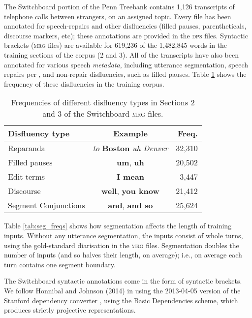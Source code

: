 \documentclass[11pt,letterpaper]{article}
\begin{document}
The Switchboard portion of the Penn Treebank \citep{marcus:93} contains 1,126
transcripts of telephone calls between strangers, on an assigned topic.
Every file has been annotated for speech-repairs and other disfluencies (filled
pauses, parentheticals, discourse markers, etc); these annotations are provided
in the \textsc{dps} files.  Syntactic brackets (\textsc{mrg} files) are available
for 619,236 of the 1,482,845 words in the training sections of the corpus (2 and 3). 
All of the transcripts have also been annotated for various speech \emph{metadata},
including utterance segmentation, speech repairs per \citet{shriberg:94}, and 
non-repair disfluencies, such as filled pauses.  Table \ref{tab:dfl_freqs} shows the
frequency of these disfluencies in the training corpus.

\begin{table}
    \centering
    \small
    \begin{tabular}{lc|r}
\hline
Disfluency type & Example & Freq. \\
\hline \hline
Reparanda & \emph{to } \textbf{Boston} \emph{uh Denver} & 32,310 \\
Filled pauses    & \textbf{um}, \textbf{uh} & 20,502 \\
Edit terms & \textbf{I mean} & 3,447 \\ 
Discourse  & \textbf{well}, \textbf{you know} & 21,412  \\
Segment Conjunctions & \textbf{and}, \textbf{and so} & 25,624 \\
\hline
\end{tabular}
\caption{\small Frequencies of different disfluency types in Sections 2 and 3 of the
Switchboard \textsc{mrg} files.\label{tab:dfl_freqs}}
\vspace*{-0.5in}
\end{table}

Table \ref{tab:seg_freqs} shows how segmentation affects the length of training
inputs.  Without any utterance segmentation, the inputs consist of whole turns,
using the gold-standard diarisation in the \textsc{mrg} files.
Segmentation doubles the number of inputs (and so halves their length, on average);
i.e., on average each turn contains one segment boundary.

The Switchboard syntactic annotations come in the form of syntactic brackets.
We follow Honnibal and Johnson (2014) in using
the 2013-04-05 version of the Stanford dependency converter \citep{stanford_deps},
using the Basic Dependencies scheme,
which produces strictly projective representations.
\end{document}

